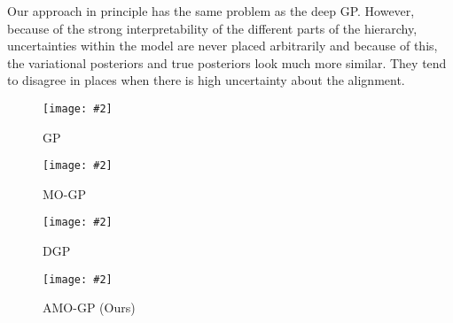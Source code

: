 \documentclass{article}
\newcommand{\includestandalonewithpath}[2][]{%
    \texttt{[image: \#2]}
}
\begin{document}
Our approach in principle has the same problem as the deep GP.
However, because of the strong interpretability of the different parts of the hierarchy, uncertainties within the model are never placed arbitrarily and because of this, the variational posteriors and true posteriors look much more similar.
They tend to disagree in places when there is high uncertainty about the alignment.

\begin{figure}[p]
    \centering
    \includestandalonewithpath{figures/app_wind_joint_gp}
    \caption{
        \label{app:fig:joint_gp}
        GP
    }
\end{figure}
\begin{figure}[p]
    \centering
    \includestandalonewithpath{figures/app_wind_joint_mo_gp}
    \caption{
        \label{app:fig:joint_mo_gp}
        MO-GP
    }
\end{figure}
\begin{figure}[p]
    \centering
    \includestandalonewithpath{figures/app_wind_joint_dgp}
    \caption{
        \label{app:fig:joint_dgp}
        DGP
    }
\end{figure}
\begin{figure}[p]
    \centering
    \includestandalonewithpath{figures/app_wind_joint_ours}
    \caption{
        \label{app:fig:joint_ours}
        AMO-GP (Ours)
    }
\end{figure}
\end{document}

